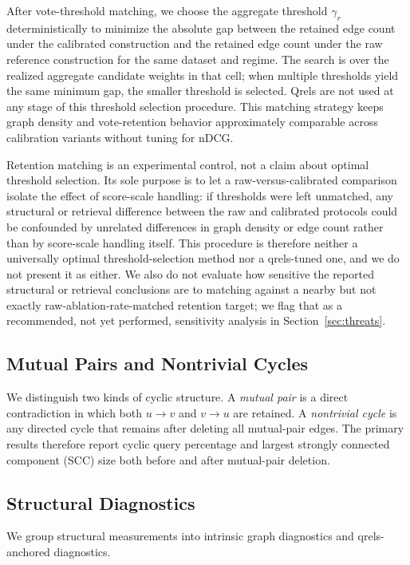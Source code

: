 \documentclass[manuscript,anonymous,review]{acmart}
\begin{document}
After vote-threshold matching, we choose the aggregate threshold $\gamma_r$
deterministically to minimize the absolute gap between the retained edge count
under the calibrated construction and the retained edge count under the raw
reference construction for the same dataset and regime. The search is over the
realized aggregate candidate weights in that cell; when multiple thresholds
yield the same minimum gap, the smaller threshold is selected. Qrels are not
used at any stage of this threshold selection procedure. This matching
strategy keeps graph density and vote-retention behavior approximately
comparable across calibration variants without tuning for nDCG.

Retention matching is an experimental control, not a claim about optimal
threshold selection. Its sole purpose is to let a raw-versus-calibrated
comparison isolate the effect of score-scale handling: if thresholds were left
unmatched, any structural or retrieval difference between the raw and
calibrated protocols could be confounded by unrelated differences in graph
density or edge count rather than by score-scale handling itself. This
procedure is therefore neither a universally optimal threshold-selection
method nor a qrels-tuned one, and we do not present it as either. We also do
not evaluate how sensitive the reported structural or retrieval conclusions
are to matching against a nearby but not exactly raw-ablation-rate-matched
retention target; we flag that as a recommended, not yet performed, sensitivity
analysis in Section~\ref{sec:threats}.

\subsection{Mutual Pairs and Nontrivial Cycles}

We distinguish two kinds of cyclic structure. A \emph{mutual pair} is a direct
contradiction in which both $u \rightarrow v$ and $v \rightarrow u$ are
retained. A \emph{nontrivial cycle} is any directed cycle that remains after
deleting all mutual-pair edges. The primary results therefore report cyclic
query percentage and largest strongly connected component (SCC) size both
before and after mutual-pair deletion.

\subsection{Structural Diagnostics}
\label{sec:structural-metrics}

We group structural measurements into intrinsic graph diagnostics and
qrels-anchored diagnostics.
\end{document}
